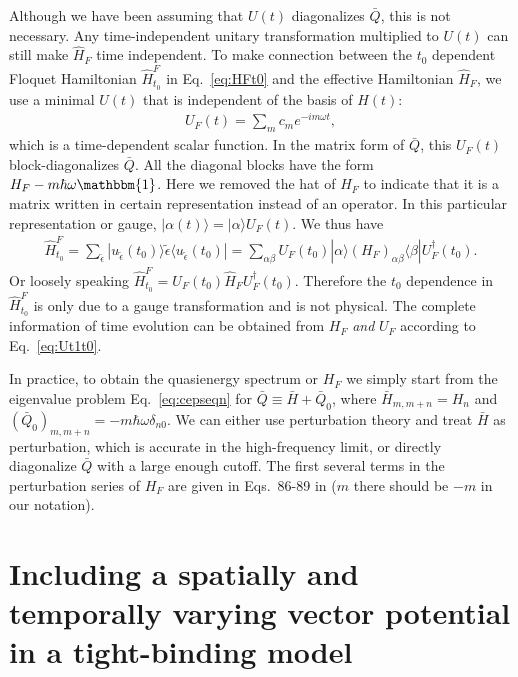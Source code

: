\documentclass[11pt,letterpaper]{article}
\begin{document}
Although we have been assuming that $U(t)$ diagonalizes $\bar{Q}$, this is not necessary. Any time-independent unitary transformation multiplied to $U(t)$ can still make $\hat{H}_F$ time independent. To make connection between the $t_0$ dependent Floquet Hamiltonian $\hat{H}^F_{t_0}$ in Eq.~\ref{eq:HFt0} and the effective Hamiltonian $\hat{H}_F$, we use a minimal $U(t)$ that is independent of the basis of $\hat{H}(t)$:
\begin{eqnarray}
U_F(t) =\sum_m c_m e^{-im\omega t}, 
\end{eqnarray}
which is a time-dependent scalar function. In the matrix form of $\bar{Q}$, this $U_F(t)$ block-diagonalizes $\bar{Q}$. All the diagonal blocks have the form $H_F - m\hbar \omega \mathbbm{1}$. Here we removed the hat of $H_F$ to indicate that it is a matrix written in certain representation instead of an operator. In this particular representation or gauge, $|\alpha(t)\rangle = |\alpha\rangle U_F(t)$. We thus have
\begin{eqnarray}
\hat{H}_{t_0}^F = \sum_{\tilde{\epsilon}}|u_{\tilde{\epsilon}}(t_0)\rangle \tilde{\epsilon} \langle u_{\tilde{\epsilon}} (t_0)| = \sum_{\alpha\beta} U_F(t_0) |\alpha\rangle (H_F)_{\alpha\beta} \langle \beta | U_F^\dag(t_0).  
\end{eqnarray}  
Or loosely speaking $\hat{H}_{t_0}^F =  U_F(t_0) \hat{H}_F U_F^\dag(t_0)$. Therefore the $t_0$ dependence in $\hat{H}_{t_0}^F$ is only due to a gauge transformation and is not physical. The complete information of time evolution can be obtained from $H_F$ \emph{and} $U_F$ according to Eq.~\ref{eq:Ut1t0}.

In practice, to obtain the quasienergy spectrum or $H_F$ we simply start from the eigenvalue problem Eq.~\ref{eq:cepseqn} for $\bar{Q}\equiv \bar{H} + \bar{Q}_0$, where $\bar{H}_{m,m+n} = H_n$ and $(\bar{Q}_0)_{m,m+n} = -m\hbar \omega \delta_{n0}$. We can either use perturbation theory and treat $\bar{H}$ as perturbation, which is accurate in the high-frequency limit, or directly diagonalize $\bar{Q}$ with a large enough cutoff. The first several terms in the perturbation series of $H_F$ are given in Eqs.~86-89 in \cite{eckardt_2015} ($m$ there should be $-m$ in our notation). 

\section{Including a spatially and temporally varying vector potential in a tight-binding model}
\end{document}
